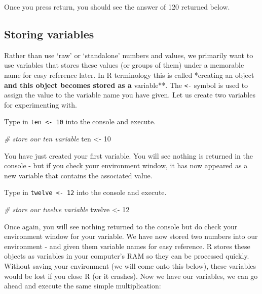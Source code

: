 \documentclass[
]{book}
\newenvironment{Shaded}{\begin{snugshade}}{\end{snugshade}}
\newcommand{\CommentTok}[1]{\textcolor[rgb]{0.56,0.35,0.01}{\textit{#1}}}
\newcommand{\DecValTok}[1]{\textcolor[rgb]{0.00,0.00,0.81}{#1}}
\newcommand{\NormalTok}[1]{#1}
\newcommand{\OtherTok}[1]{\textcolor[rgb]{0.56,0.35,0.01}{#1}}
\begin{document}
Once you press return, you should see the answer of 120 returned below.

\hypertarget{storing-variables}{%
\subsection{Storing variables}\label{storing-variables}}

Rather than use `raw' or `standalone' numbers and values, we primarily want to use variables that stores these values (or groups of them) under a memorable name for easy reference later. In R terminology this is called *creating an object\textbf{ and this object becomes stored as a }variable**. The \texttt{\textless{}-} symbol is used to assign the value to the variable name you have given. Let us create two variables for experimenting with.

Type in \texttt{ten\ \textless{}-\ 10} into the console and execute.

\begin{Shaded}
\begin{Highlighting}[]
\CommentTok{\# store our ten variable}
\NormalTok{ten }\OtherTok{\textless{}{-}} \DecValTok{10}
\end{Highlighting}
\end{Shaded}

You have just created your first variable. You will see nothing is returned in the console - but if you check your environment window, it has now appeared as a new variable that contains the associated value.

Type in \texttt{twelve\ \textless{}-\ 12} into the console and execute.

\begin{Shaded}
\begin{Highlighting}[]
\CommentTok{\# store our twelve variable}
\NormalTok{twelve }\OtherTok{\textless{}{-}} \DecValTok{12}
\end{Highlighting}
\end{Shaded}

Once again, you will see nothing returned to the console but do check your environment window for your variable. We have now stored two numbers into our environment - and given them variable names for easy reference. R stores these objects as variables in your computer's RAM so they can be processed quickly. Without saving your environment (we will come onto this below), these variables would be lost if you close R (or it crashes). Now we have our variables, we can go ahead and execute the same simple multiplication:
\end{document}
